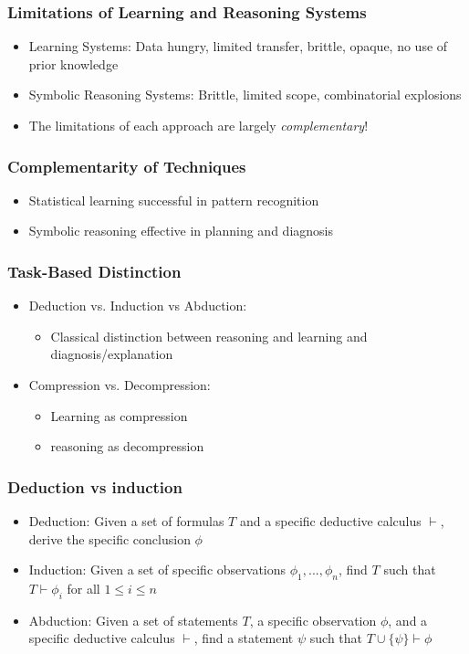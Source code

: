 \documentclass{beamer}
\begin{document}
\begin{frame}
\frametitle{Limitations of Learning and Reasoning Systems}
\begin{itemize}
\item Learning Systems: Data hungry, limited transfer, brittle,
  opaque, no use of prior knowledge
\item Symbolic Reasoning Systems: Brittle, limited scope,
  combinatorial explosions
  \pause
\item The limitations of each approach are largely {\em
    complementary}!
\end{itemize}
\end{frame}

\begin{frame}
\frametitle{Complementarity of Techniques}
\begin{itemize}
\item Statistical learning successful in pattern recognition
\item Symbolic reasoning effective in planning and diagnosis
\end{itemize}
\end{frame}

\begin{frame}
\frametitle{Task-Based Distinction}
\begin{itemize}
\item Deduction vs. Induction vs Abduction:
  \begin{itemize}
  \item Classical distinction between reasoning and learning and diagnosis/explanation
  \end{itemize}
\item Compression vs. Decompression:
  \begin{itemize}
  \item Learning as compression
  \item reasoning as decompression
  \end{itemize}
\end{itemize}
\end{frame}

\begin{frame}
  \frametitle{Deduction vs induction}
  \begin{itemize}
  \item Deduction: Given a set of formulas $T$ and a specific
    deductive calculus $\vdash$, derive the specific conclusion
    $\phi$
  \item Induction: Given a set of specific observations
    $\phi_1,...,\phi_n$, find $T$ such that $T \vdash \phi_i$ for all
    $1 \leq i \leq n$
  \item Abduction: Given a set of statements $T$, a specific
    observation $\phi$, and a specific deductive calculus $\vdash$,
    find a statement $\psi$ such that
    $T \cup \{ \psi \} \vdash \phi$
  \end{itemize}
\end{frame}
\end{document}
